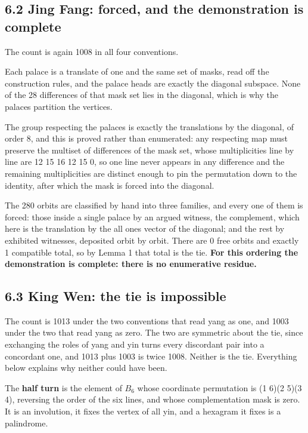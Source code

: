 \documentclass[11pt,a4paper]{article}
\begin{document}
\subsection*{6.2 Jing Fang: forced, and the demonstration is complete}

The count is again 1008 in all four conventions.

Each palace is a translate of one and the same set of masks, read off the construction rules, and the palace heads are exactly the diagonal subspace. None of the 28 differences of that mask set lies in the diagonal, which is why the palaces partition the vertices.

The group respecting the palaces is exactly the translations by the diagonal, of order 8, and this is proved rather than enumerated: any respecting map must preserve the multiset of differences of the mask set, whose multiplicities line by line are 12 15 16 12 15 0, so one line never appears in any difference and the remaining multiplicities are distinct enough to pin the permutation down to the identity, after which the mask is forced into the diagonal.

The 280 orbits are classified by hand into three families, and every one of them is forced: those inside a single palace by an argued witness, the complement, which here is the translation by the all ones vector of the diagonal; and the rest by exhibited witnesses, deposited orbit by orbit. There are 0 free orbits and exactly 1 compatible total, so by Lemma 1 that total is the tie. \textbf{For this ordering the demonstration is complete: there is no enumerative residue.}

\subsection*{6.3 King Wen: the tie is impossible}

The count is 1013 under the two conventions that read yang as one, and 1003 under the two that read yang as zero. The two are symmetric about the tie, since exchanging the roles of yang and yin turns every discordant pair into a concordant one, and 1013 plus 1003 is twice 1008. Neither is the tie. Everything below explains why neither could have been.

The \textbf{half turn} is the element of $B_6$ whose coordinate permutation is (1 6)(2 5)(3 4), reversing the order of the six lines, and whose complementation mask is zero. It is an involution, it fixes the vertex of all yin, and a hexagram it fixes is a palindrome.
\end{document}
